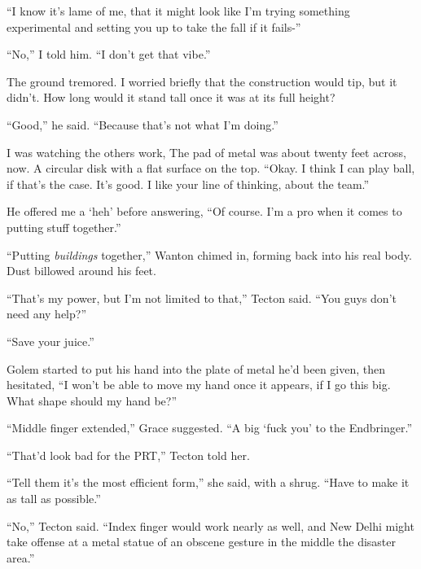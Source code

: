 ``I know it's lame of me, that it might look like I'm trying something experimental and setting you up to take the fall if it fails-''



``No,'' I told him.  ``I don't get that vibe.''



The ground tremored.  I worried briefly that the construction would tip, but it didn't.  How long would it stand tall once it was at its full height?



``Good,'' he said.  ``Because that's not what I'm doing.''



I was watching the others work, The pad of metal was about twenty feet across, now.  A circular disk with a flat surface on the top.  ``Okay.  I think I can play ball, if that's the case.  It's good.  I like your line of thinking, about the team.''



He offered me a `heh' before answering, ``Of course.  I'm a pro when it comes to putting stuff together.''



``Putting \emph{buildings }together,'' Wanton chimed in, forming back into his real body.  Dust billowed around his feet.



``That's my power, but I'm not limited to that,'' Tecton said.  ``You guys don't need any help?''



``Save your juice.''



Golem started to put his hand into the plate of metal he'd been given, then hesitated, ``I won't be able to move my hand once it appears, if I go this big.  What shape should my hand be?''



``Middle finger extended,'' Grace suggested.  ``A big `fuck you' to the Endbringer.''



``That'd look bad for the PRT,'' Tecton told her.



``Tell them it's the most efficient form,'' she said, with a shrug.  ``Have to make it as tall as possible.''



``No,'' Tecton said.  ``Index finger would work nearly as well, and New Delhi might take offense at a metal statue of an obscene gesture in the middle the disaster area.''




